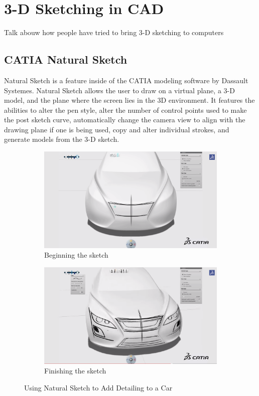 \documentclass[12pt]{report}
\begin{document}
\section{3-D Sketching in CAD}

Talk abouw how people have tried to bring 3-D sketching to computers

\subsection{CATIA Natural Sketch}

Natural Sketch is a feature inside of the CATIA modeling software by Dassault Systemes. Natural Sketch allows the user to draw on a virtual plane, a 3-D model, and the plane where the screen lies in the 3D environment. It features the abilities to alter the pen style, alter the number of control points used to make the post sketch curve, automatically change the camera view to align with the drawing plane if one is being used, copy and alter individual strokes, and generate models from the 3-D sketch.

\begin{figure}

\begin{subfigure}{\textwidth}
\includegraphics[width=\textwidth]{CATIA1}
\caption{Beginning the sketch}
\end{subfigure}
\begin{subfigure}{\textwidth}
\includegraphics[width=\textwidth]{CATIA2}
\caption{Finishing the sketch}
\end{subfigure}

\caption{Using Natural Sketch to Add Detailing to a Car}
\end{figure}
\end{document}
